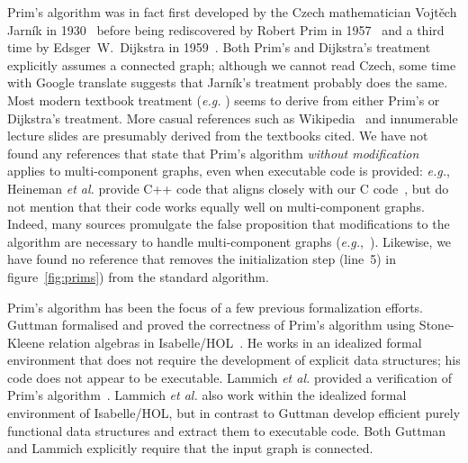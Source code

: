 Prim's algorithm was in fact first developed by the Czech mathematician Vojt\v{e}ch Jarn\'{i}k in 1930~\cite{prim1:jarnik} before being rediscovered by Robert Prim in 1957~\cite{prim2:prim} and a third time by Edsger~W.~Dijkstra in 1959~\cite{prim3:dijkstra}.  Both Prim's and Dijkstra's treatment explicitly assumes a connected graph; although we cannot read Czech, some time with Google translate suggests that Jarn\'{i}k's treatment probably does the same.  Most modern textbook treatment (\emph{e.g.} \cite{kepnergilbert,sedgewick,rozen,DBLP:books/daglib/0022194,clrs}) seems to derive from either Prim's or Dijkstra's treatment.
More casual references such as Wikipedia~\cite{prim:wiki} and innumerable lecture slides are presumably derived from the textbooks cited.  We have not found any references that state that Prim's algorithm \emph{without modification} applies to multi-component graphs, even when executable code is provided: \emph{e.g.}, Heineman \emph{et al.} provide C++ code that aligns closely with our C code~\cite{heineman2008algorithms}, but do not mention that their code works equally well on multi-component graphs.  Indeed, many sources promulgate the false proposition that modifications to the algorithm are necessary to handle multi-component graphs (\emph{e.g.},~\cite{kepnergilbert,sedgewick,rozen,prim:wiki}).  Likewise, we have found no reference that removes the initialization step (line~5) in figure~\ref{fig:prims}) from the standard algorithm.

Prim's algorithm has been the focus of a few previous formalization efforts.  Guttman formalised and proved the correctness of Prim's algorithm using Stone-Kleene relation algebras in Isabelle/HOL~\cite{DBLP:conf/ictac/Guttmann16}.  He works in an idealized formal environment that does not require the development of explicit data structures; his code does not appear to be executable.  Lammich \emph{et al.} provided a verification of Prim's algorithm~\cite{DBLP:journals/afp/LammichN19}.  Lammich \emph{et al.} also work within the idealized formal environment of Isabelle/HOL, but in contrast to Guttman develop efficient purely functional data structures and extract them to executable code.  Both Guttman and Lammich explicitly require that the input graph is connected. %





